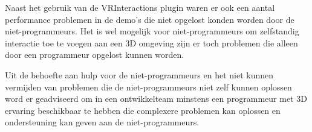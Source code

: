 Naast het gebruik van de VRInteractions plugin waren er ook een aantal performance problemen in de demo's die niet opgelost konden worden door de niet-programmeurs. Het is wel mogelijk voor niet-programmeurs om zelfstandig interactie toe te voegen aan een 3D omgeving zijn er toch problemen die alleen door een programmeur opgelost kunnen worden.

Uit de behoefte aan hulp voor de niet-programmeurs en het niet kunnen vermijden van problemen die de niet-programmeurs niet zelf kunnen oplossen word er geadviseerd om in een ontwikkelteam minstens een programmeur met 3D ervaring beschikbaar te hebben die complexere problemen kan oplossen en ondersteuning kan geven aan de niet-programmeurs.